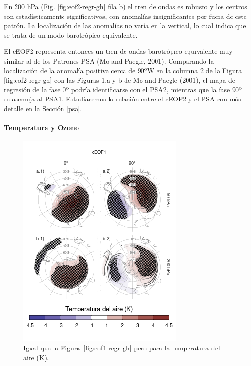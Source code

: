\documentclass[12pt,oneside]{reedthesis}
\begin{document}
En 200 hPa (Fig. \ref{fig:eof2-regr-gh} fila b) el tren de ondas es robusto y los centros son estadísticamente significativos, con anomalías insignificantes por fuera de este patrón.
La localización de las anomalías no varía en la vertical, lo cual indica que se trata de un modo barotrópico equivalente.

El cEOF2 representa entonces un tren de ondas barotrópico equivalente muy similar al de los Patrones PSA (Mo and Paegle, 2001).
Comparando la localización de la anomalía positiva cerca de 90ºW en la columna 2 de la Figura \ref{fig:eof2-regr-gh} con las Figuras 1.a y b de Mo and Paegle (2001), el mapa de regresión de la fase 0º podría identificarse con el PSA2, mientras que la fase 90º se asemeja al PSA1.
Estudiaremos la relación entre el cEOF2 y el PSA con más detalle en la Sección \ref{psa}.

\hypertarget{temperatura-y-ozono}{%
\paragraph{Temperatura y Ozono}\label{temperatura-y-ozono}}



\begin{figure}
\includegraphics{figures/20-ceofs/eof1-regr-t-1} \caption{Igual que la Figura~\ref{fig:eof1-regr-gh} pero para la temperatura del aire (K).}\label{fig:eof1-regr-t}
\end{figure}
\end{document}
